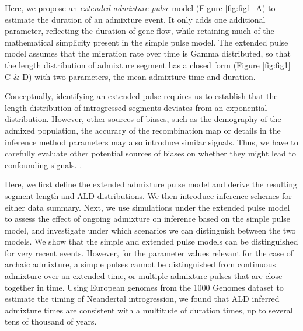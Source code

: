 \documentclass[11pt]{article}
\begin{document}
Here, we propose an \emph{extended admixture pulse} model (Figure \ref{fig:fig1} A) to estimate the duration of an admixture event. It only adds one additional parameter, reflecting the duration of gene flow, while retaining much of the mathematical simplicity present in the simple pulse model. 
The extended pulse model assumes that the migration rate over time is Gamma distributed, so that the length distribution of admixture segment has a closed form (Figure \ref{fig:fig1} C \& D) with two parameters, the mean admixture time and duration.

Conceptually, identifying an extended pulse requires us to establish that the length distribution of introgressed segments deviates from an exponential distribution. However, other sources of biases, such as the demography of the admixed population, the accuracy of the recombination map or details in the inference method parameters may also introduce similar signals. Thus, we have to carefully evaluate other potential sources of biases on whether they might lead to confounding signals. \citep{sankararaman_date_2012,fu_genome_2014,moorjani_genetic_2016}. 



Here, we first define the extended admixture pulse model and derive the resulting segment length and ALD distributions. We then introduce inference schemes for either data summary. Next, we use simulations under the extended pulse model to assess the effect of ongoing admixture on inference based on the simple pulse model, and investigate under which scenarios we can distinguish between the two models. We show that the simple and extended pulse models can be distinguished for very recent events. However, for the parameter values relevant for the  case of archaic admixture, a simple pulses cannot be distinguished from continuous admixture  over an extended time, or multiple admixture pulses that are close together in time. Using European genomes from the 1000 Genomes dataset \citep{the_1000_genomes_project_consortium_global_2015} to estimate the timing of Neandertal introgression, we found that ALD inferred admixture times are consistent with a multitude of duration times, up to several tens of thousand of years.
\end{document}
